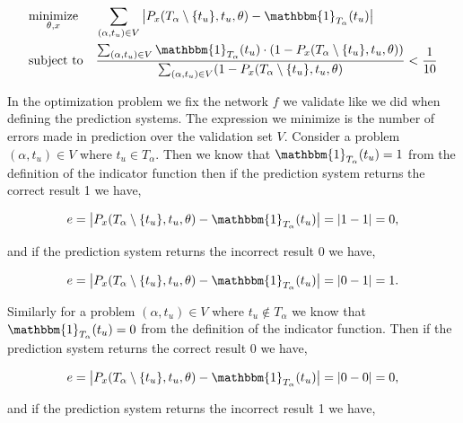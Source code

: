 \begin{equation}
    \label{eq:prediction_system_minimization}
    \begin{aligned}
        & \underset{\theta, x}{\text{minimize}}
        & & \sum_{(\alpha, t_u) \in V} \left|
            P_x(T_\alpha \setminus \{t_u\}, t_u, \theta) -
            \mathbbm{1}_{T_\alpha}(t_u)
        \right| \\
        & \text{subject to}
        & & \frac{\sum_{(\alpha, t_u) \in V} \mathbbm{1}_{T_\alpha}(t_u) \cdot
            \left(1 - P_x(T_\alpha \setminus \{t_u\}, t_u, \theta)\right)}
{\sum_{(\alpha, t_u) \in V} (1 - P_x(T_\alpha \setminus \{t_u\}, t_u, \theta)} <
            \frac{1}{10}
    \end{aligned}
\end{equation}

In the optimization problem we fix the network $f$ we validate like we did
when defining the prediction systems. The expression we minimize is the
number of errors made in prediction over the validation set $V$. Consider a
problem $(\alpha, t_u) \in V$ where $t_u \in T_\alpha$. Then we know that
$\mathbbm{1}_{T_\alpha}(t_u) = 1$ from the definition of the indicator function
then if the prediction system returns the correct result 1 we have,

\begin{equation}
    e = \left|
        P_x(T_\alpha \setminus \{t_u\}, t_u, \theta) -
        \mathbbm{1}_{T_\alpha}(t_u)
    \right| = |1 - 1| = 0,
\end{equation}

and if the prediction system returns the incorrect result 0 we have,

\begin{equation}
    e = \left|
        P_x(T_\alpha \setminus \{t_u\}, t_u, \theta) -
        \mathbbm{1}_{T_\alpha}(t_u)
    \right| = |0 - 1| = 1.
\end{equation}

Similarly for a problem $(\alpha, t_u) \in V$ where $t_u \notin T_\alpha$ we
know that $\mathbbm{1}_{T_\alpha}(t_u) = 0$ from the definition of the indicator
function. Then if the prediction system returns the correct result 0 we have,

\begin{equation}
    e = \left|
        P_x(T_\alpha \setminus \{t_u\}, t_u, \theta) -
        \mathbbm{1}_{T_\alpha}(t_u)
    \right| = |0 - 0| = 0, \end{equation}

and if the prediction system returns the incorrect result 1 we have,

